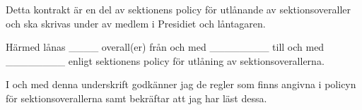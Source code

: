 \documentclass{dtek}
\begin{document}
\newpage

Detta kontrakt är en del av sektionens policy för utlånande av sektionsoveraller och ska skrivas under av medlem i Presidiet och låntagaren.

Härmed lånas \_\_\_\_ overall(er) från och med \_\_\_\_\_\_\_\_ till och med \_\_\_\_\_\_\_\_ enligt sektionens policy för utlåning av sektionsoverallerna.

I och med denna underskrift godkänner jag de regler som finns angivna i policyn för sektionsoverallerna samt bekräftar att jag har läst dessa.

 \\
 \\
\end{document}
